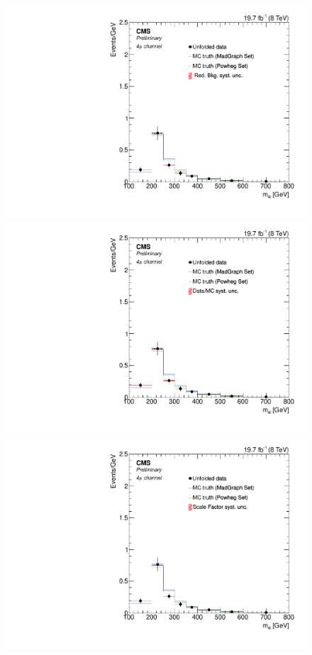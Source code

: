 \begin{figure}[hbtp]
\begin{center}
    \includegraphics[width=0.8\cmsFigWidth]{Figures/Unfolding/Systematics/ZZTo4m_Mass_RedBkg_Pow_fr}     
    \includegraphics[width=0.8\cmsFigWidth]{Figures/Unfolding/Systematics/ZZTo4m_Mass_UnfDataOverGenMC_Pow_fr}  
    \includegraphics[width=0.8\cmsFigWidth]{Figures/Unfolding/Systematics/ZZTo4m_Mass_SFSq_Pow_fr}                  

\end{center}
\end{figure}
